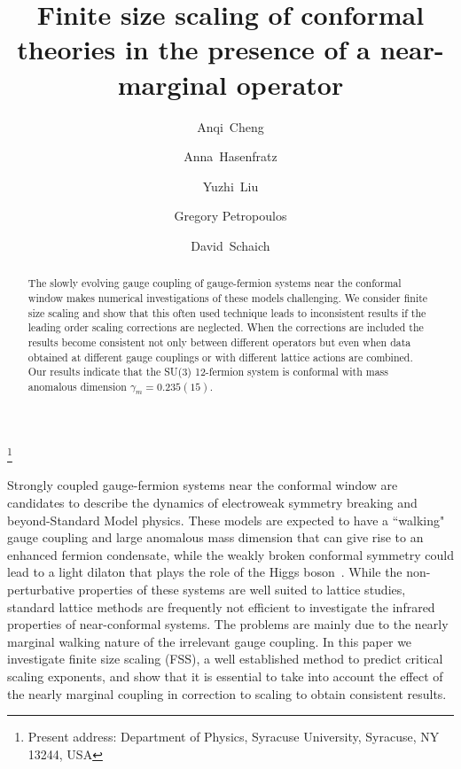 \documentclass[aps,prl,twocolumn,]{revtex4-1}  %
\begin{document}
\title{Finite size scaling of conformal theories in the presence of a near-marginal operator}


\author{Anqi~Cheng}
\author{Anna~Hasenfratz}
\author{Yuzhi~Liu}
\author{Gregory Petropoulos}
\author{David~Schaich}
\thanks{Present address: Department of Physics, Syracuse University, Syracuse, NY 13244, USA}

\begin{abstract}
The  slowly evolving gauge coupling of   gauge-fermion systems near the conformal window makes  numerical investigations of these models challenging. We consider finite size scaling and show that this  often used technique leads to inconsistent results if the leading order scaling corrections are neglected. When the corrections are included the results become consistent not only between different operators but  even when  data obtained at different gauge couplings or with different lattice actions are combined. Our results indicate that the SU(3) 12-fermion system is conformal with mass anomalous dimension $\gamma_m=0.235(15)$. 
\end{abstract}

\maketitle



Strongly coupled gauge-fermion systems near the conformal window are   candidates to describe the dynamics of electroweak symmetry breaking and beyond-Standard Model physics. 
These models are  expected to have a ``walking"  gauge coupling  and large anomalous mass dimension that can give rise to an enhanced fermion condensate,  while the weakly broken conformal symmetry could lead to a light dilaton that  plays the role of the Higgs boson~\cite{Appelquist:2013sia}. 
While the  non-perturbative properties of these systems are well suited to lattice studies,   standard lattice methods are frequently not efficient to investigate the infrared properties of near-conformal systems. 
The problems are mainly due to  the nearly marginal walking nature of the irrelevant gauge coupling. In this paper we investigate finite size scaling (FSS), a well established method to predict critical scaling exponents,
 and show that it is essential to take into account the effect of the nearly marginal  coupling in correction to scaling to obtain consistent results. 
\end{document}
